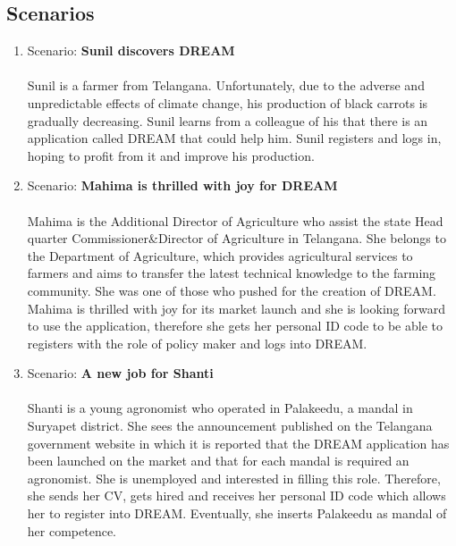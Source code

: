 \subsection{Scenarios}

\begin{enumerate}

\item Scenario: \textbf{Sunil discovers DREAM}\\\\
Sunil is a farmer from Telangana. Unfortunately, due to the adverse and unpredictable effects of climate change, his production of black carrots is gradually decreasing. Sunil learns from a colleague of his that there is an application called DREAM that could help him. Sunil registers and logs in, hoping to profit from it and improve his production.\\

\item Scenario: \textbf{Mahima is thrilled with joy for DREAM}\\\\
Mahima is the Additional Director of Agriculture who assist the state Head quarter Commissioner\&Director of Agriculture in Telangana. She belongs to the Department of Agriculture, which provides agricultural services to farmers and aims to transfer the latest technical knowledge to the farming community. She was one of those who pushed for the creation of DREAM.
Mahima is thrilled with joy for its market launch and she is looking forward to use the application, therefore she gets her personal ID code to be able to registers with the role of policy maker and logs into DREAM.\\

\item Scenario: \textbf{A new job for Shanti}\\\\
Shanti is a young agronomist who operated in Palakeedu, a mandal in Suryapet district. She sees the announcement published on the Telangana government website in which it is reported that the DREAM application has been launched on the market and that for each mandal is required an agronomist. She is unemployed and interested in filling this role. Therefore, she sends her CV, gets hired and receives her personal ID code which allows her to register into DREAM. Eventually, she inserts Palakeedu as mandal of her competence.\\


\end{enumerate}
